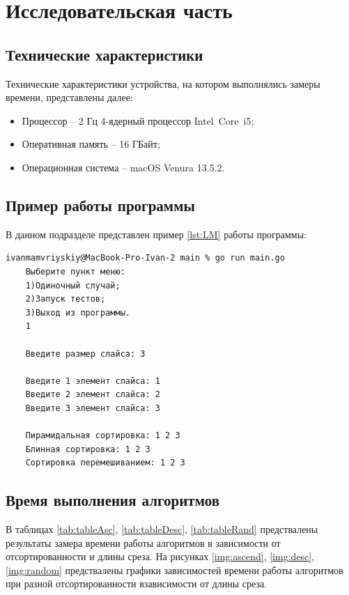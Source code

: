 \chapter{Исследовательская часть}

\section{Технические характеристики}

Технические характеристики устройства, на котором выполнялись замеры времени, представлены далее:

\begin{itemize}
	\item Процессор -- 2 Гц 4‑ядерный процессор Intel Core i5;
	\item Оперативная память -- 16 ГБайт;
	\item Операционная система -- macOS Venura 13.5.2. 
\end{itemize}

\section{Пример работы программы}


В данном подразделе представлен пример \ref{lst:LM} работы программы:

\begin{lstlisting}[label=lst:LM,caption=Пример работы программы]
	ivanmamvriyskiy@MacBook-Pro-Ivan-2 main % go run main.go 
	Выберите пункт меню:
	1)Одиночный случай;
	2)Запуск тестов;
	3)Выход из программы.
	1

	Введите размер слайса: 3

	Введите 1 элемент слайса: 1
	Введите 2 элемент слайса: 2
	Введите 3 элемент слайса: 3

	Пирамидальная сортировка: 1 2 3 
	Блинная сортировка: 1 2 3 
	Сортировка перемешиванием: 1 2 3 
\end{lstlisting}

\clearpage
\section{Время выполнения алгоритмов}

В таблицах \ref{tab:tableAsc}, \ref{tab:tableDesc}, \ref{tab:tableRand} предствалены результаты замера времени работы алгоритмов
в зависимости от отсортированности и длины среза. На рисунках 
\ref{img:ascend}, \ref{img:desc}, \ref{img:random} предствалены графики зависимостей времени работы алгоритмов при разной
отсортированности взависимости от длины среза. 

